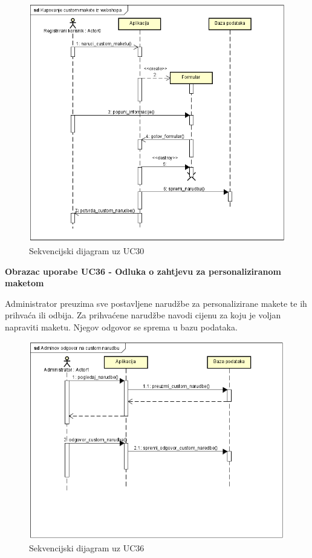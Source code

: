 				\begin{figure} [!h]
					\centering
					\includegraphics[scale=0.65]{"slike/seqdiag_01"}
					\caption{Sekvencijski dijagram uz UC30}
					\label{fig:seqdiag_01}
				\end{figure}
				\pagebreak
				
				\textbf{Obrazac uporabe UC36 - Odluka o zahtjevu za personaliziranom maketom}
				
				Administrator preuzima sve postavljene narudžbe za personalizirane makete te ih prihvaća ili odbija. Za prihvaćene narudžbe navodi cijenu za koju je voljan napraviti maketu. Njegov odgovor se sprema u bazu podataka. 
				
				\begin{figure} [!h]
					\centering
					\includegraphics[scale=0.65]{"slike/seqdiag_02"}
					\caption{Sekvencijski dijagram uz UC36}
					\label{fig:seqdiag_02}
				\end{figure}
				\pagebreak
				
